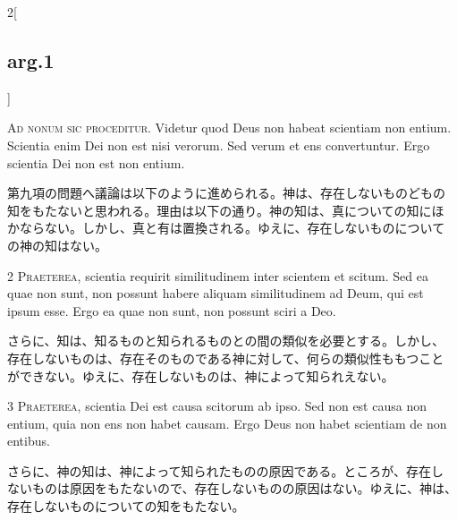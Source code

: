 \documentclass[paper=a4paper,fontsize=10pt,jafontsize=9pt,titlepage]{jlreq}
\begin{document}
\begin{paracol}{2}[\subsection{arg.1}]

{\huge A}{\scshape d nonum sic proceditur}. Videtur quod Deus non
habeat scientiam non entium. Scientia enim Dei non est nisi
verorum. Sed verum et ens convertuntur. Ergo scientia Dei non est non
entium.

\switchcolumn

第九項の問題へ議論は以下のように進められる。神は、存在しないものどもの
知をもたないと思われる。理由は以下の通り。神の知は、真についての知にほ
かならない。しかし、真と有は置換される。ゆえに、存在しないものについて
の神の知はない。


{\scshape 2 Praeterea}, scientia requirit similitudinem inter scientem
et scitum. Sed ea quae non sunt, non possunt habere aliquam
similitudinem ad Deum, qui est ipsum esse. Ergo ea quae non sunt, non
possunt sciri a Deo.

\switchcolumn

さらに、知は、知るものと知られるものとの間の類似を必要とする。しかし、
存在しないものは、存在そのものである神に対して、何らの類似性ももつこと
ができない。ゆえに、存在しないものは、神によって知られえない。


{\scshape 3 Praeterea}, scientia Dei est causa scitorum ab ipso. Sed
non est causa non entium, quia non ens non habet causam. Ergo Deus non
habet scientiam de non entibus.

\switchcolumn

さらに、神の知は、神によって知られたものの原因である。ところが、存在し
ないものは原因をもたないので、存在しないものの原因はない。ゆえに、神は、
存在しないものについての知をもたない。

\switchcolumn*[\subsection{s.c.}]


\end{paracol}
\end{document}
